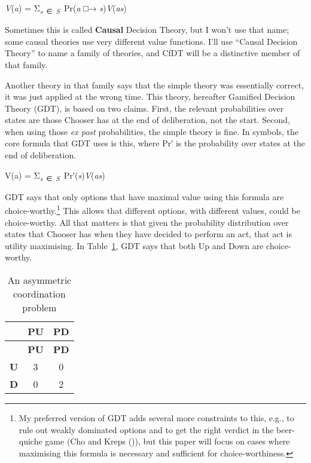 \documentclass[
  10pt,
  letterpaper,
  DIV=11,
  numbers=noendperiod,
  twoside]{scrartcl}
\providecommand{\tightlist}{%
  \setlength{\itemsep}{0pt}\setlength{\parskip}{0pt}}\usepackage{longtable,booktabs,array}
\begin{document}
\begin{description}
\tightlist
\item[CfDT]
\emph{V}(\emph{a}) = Σ\textsubscript{\emph{s}~∈~\emph{S}}~Pr(\emph{a} □→
\emph{s})\emph{V}(\emph{as})
\end{description}

Sometimes this is called \textbf{Causal} Decision Theory, but I won't
use that name; some causal theories use very different value functions.
I'll use ``Causal Decision Theory'' to name a family of theories, and
CfDT will be a distinctive member of that family.

Another theory in that family says that the simple theory was
essentially correct, it was just applied at the wrong time. This theory,
hereafter Gamified Decision Theory (GDT), is based on two claims. First,
the relevant probabilities over states are those Chooser has at the end
of deliberation, not the start. Second, when using those \emph{ex post}
probabilities, the simple theory is fine. In symbols, the core formula
that GDT uses is this, where Pr′ is the probability over states at the
end of deliberation.

\begin{description}
\tightlist
\item[GDT]
V(a) =
Σ\textsubscript{\emph{s}~∈~\emph{S}}~Pr′(\emph{s})\emph{V}(\emph{as})
\end{description}

GDT says that only options that have maximal value using this formula
are choice-worthy.\footnote{My preferred version of GDT adds several
  more constraints to this, e.g., to rule out weakly dominated options
  and to get the right verdict in the beer-quiche game (Cho and Kreps
  ()), but this paper will focus on
  cases where maximising this formula is necessary and sufficient for
  choice-worthiness.} This allows that different options, with different
values, could be choice-worthy. All that matters is that given the
probability distribution over states that Chooser has when they have
decided to perform an act, that act is utility maximising. In
Table~\ref{tbl-first-coord}, GDT says that both Up and Down are
choice-worthy.

\begin{longtable}[]{@{}ccc@{}}
\caption{An asymmetric coordination
problem}\label{tbl-first-coord}\tabularnewline
\toprule\noalign{}
& \textbf{PU} & \textbf{PD} \\
\midrule\noalign{}
\endfirsthead
\toprule\noalign{}
& \textbf{PU} & \textbf{PD} \\
\midrule\noalign{}
\endhead
\bottomrule\noalign{}
\endlastfoot
\textbf{U} & 3 & 0 \\
\textbf{D} & 0 & 2 \\
\end{longtable}
\end{document}
